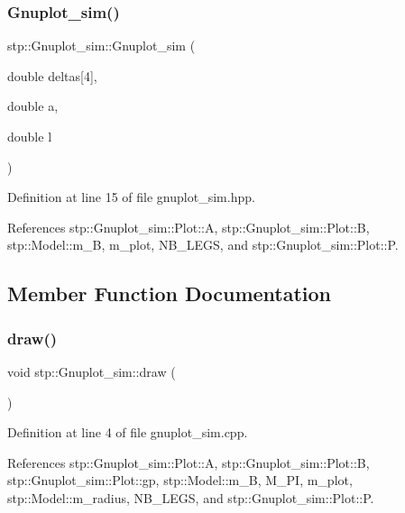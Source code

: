 \subsubsection{\texorpdfstring{Gnuplot\+\_\+sim()}{Gnuplot\_sim()}}
{\footnotesize\ttfamily stp\+::\+Gnuplot\+\_\+sim\+::\+Gnuplot\+\_\+sim (\begin{DoxyParamCaption}\item[{double}]{deltas\mbox{[}4\mbox{]},  }\item[{double}]{a,  }\item[{double}]{l }\end{DoxyParamCaption})\hspace{0.3cm}{\ttfamily [inline]}}



Definition at line 15 of file gnuplot\+\_\+sim.\+hpp.



References stp\+::\+Gnuplot\+\_\+sim\+::\+Plot\+::A, stp\+::\+Gnuplot\+\_\+sim\+::\+Plot\+::B, stp\+::\+Model\+::m\+\_\+B, m\+\_\+plot, N\+B\+\_\+\+L\+E\+GS, and stp\+::\+Gnuplot\+\_\+sim\+::\+Plot\+::P.



\subsection{Member Function Documentation}
\mbox{\label{classstp_1_1_gnuplot__sim_a7d01da793fef045e81a8927ab7316d61}} 
\subsubsection{\texorpdfstring{draw()}{draw()}}
{\footnotesize\ttfamily void stp\+::\+Gnuplot\+\_\+sim\+::draw (\begin{DoxyParamCaption}{ }\end{DoxyParamCaption})}



Definition at line 4 of file gnuplot\+\_\+sim.\+cpp.



References stp\+::\+Gnuplot\+\_\+sim\+::\+Plot\+::A, stp\+::\+Gnuplot\+\_\+sim\+::\+Plot\+::B, stp\+::\+Gnuplot\+\_\+sim\+::\+Plot\+::gp, stp\+::\+Model\+::m\+\_\+B, M\+\_\+\+PI, m\+\_\+plot, stp\+::\+Model\+::m\+\_\+radius, N\+B\+\_\+\+L\+E\+GS, and stp\+::\+Gnuplot\+\_\+sim\+::\+Plot\+::P.



